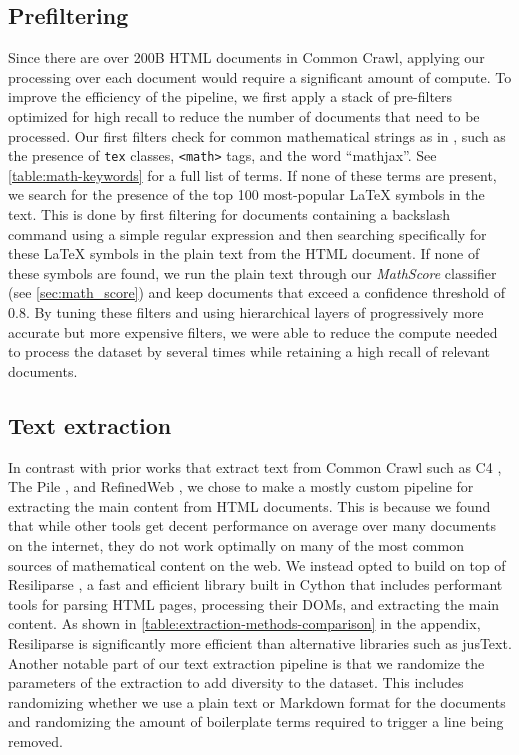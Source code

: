 \subsection{Prefiltering}

Since there are over 200B HTML documents in Common Crawl, applying our processing over each document would require a significant amount of compute. To improve the efficiency of the pipeline, we first apply a stack of pre-filters optimized for high recall to reduce the number of documents that need to be processed. Our first filters check for common mathematical strings as in \citet{lewkowycz2022solving}, such as the presence of \texttt{tex} classes, \texttt{<math>} tags, and the word ``mathjax''. See \autoref{table:math-keywords} for a full list of terms. If none of these terms are present, we search for the presence of the top 100 most-popular \LaTeX{} symbols in the text. This is done by first filtering for documents containing a backslash command using a simple regular expression and then searching specifically for these \LaTeX{} symbols in the plain text from the HTML document. If none of these symbols are found, we run the plain text through our \textit{MathScore} classifier (see \autoref{sec:math_score}) and keep documents that exceed a confidence threshold of 0.8. By tuning these filters and using hierarchical layers of progressively more accurate but more expensive filters, we were able to reduce the compute needed to process the dataset by several times while retaining a high recall of relevant documents.

\subsection{Text extraction}

In contrast with prior works that extract text from Common Crawl such as C4 \citep{collins2023evaluating}, The Pile \citep{gao2020pile}, and RefinedWeb \citep{refined-web}, we chose to make a mostly custom pipeline for extracting the main content from HTML documents. This is because we found that while other tools get decent performance on average over many documents on the internet, they do not work optimally on many of the most common sources of mathematical content on the web. We instead opted to build on top of Resiliparse \citep{bevendorff:2018, bevendorff:2021c}, a fast and efficient library built in Cython that includes performant tools for parsing HTML pages, processing their DOMs, and extracting the main content. As shown in \autoref{table:extraction-methods-comparison} in the appendix, Resiliparse is significantly more efficient than alternative libraries such as jusText. Another notable part of our text extraction pipeline is that we randomize the parameters of the extraction to add diversity to the dataset. This includes randomizing whether we use a plain text or Markdown format for the documents and randomizing the amount of boilerplate terms required to trigger a line being removed.

